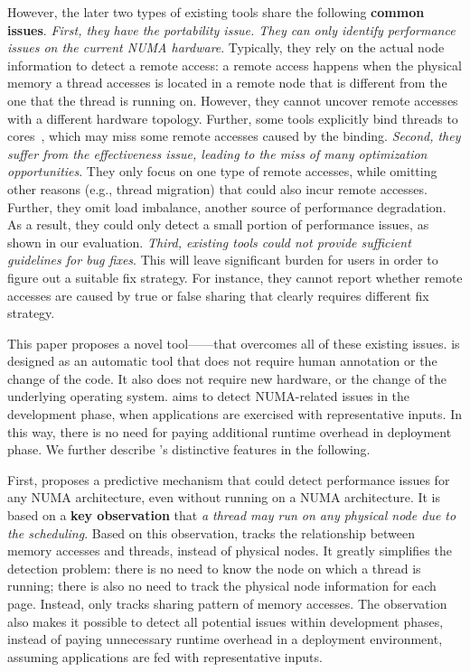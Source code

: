 However, the later two types of existing tools share the following \textbf{common issues}. \textit{First, they have the portability issue. They can only identify performance issues on the current NUMA hardware}. Typically, they rely on the actual node information to detect a remote access: a remote access happens when the physical memory a thread accesses is located in a remote node that is different from the one that the thread is running on. However, they cannot uncover remote accesses with a different hardware topology. Further, some  tools explicitly bind threads to cores~\cite{XuNuma}, which may miss some remote accesses caused by the binding. \textit{Second, they suffer from the effectiveness issue, leading to the miss of many optimization opportunities}. They only focus on one type of remote accesses, while omitting other reasons (e.g., thread migration) that could also incur remote accesses. Further, they omit load imbalance, another source of performance degradation. As a result, they could only detect a small portion of performance issues, as shown in our evaluation. \textit{Third, existing tools could not provide sufficient guidelines for bug fixes}. This will leave significant burden for users in order to figure out a suitable fix strategy. For instance, they cannot report whether remote accesses are caused by true or false sharing that clearly requires different fix strategy.   


This paper proposes a novel tool---\NP{}---that overcomes all of these existing issues. \NP{} is designed as an automatic tool that does not require human annotation or the change of the code. It also does not require new hardware, or the change of the underlying operating system. \NP{} aims to detect  NUMA-related issues in the development phase, when applications are exercised with representative inputs. In this way, there is no need for paying additional runtime overhead in deployment phase. We further describe \NP{}'s distinctive features in the following. 

First, \NP{} proposes a predictive mechanism that could detect performance issues for any NUMA architecture, even without running on a NUMA architecture. It is based on a \textbf{key observation} that \textit{a thread may run on any physical node due to the scheduling}. Based on this observation, \NP{} tracks the relationship between memory accesses and threads, instead of physical nodes. It greatly simplifies the detection problem: there is no need to know the node on which a thread is running; there is also no need to track the physical node information for each page. Instead, \NP{} only tracks sharing pattern of memory accesses. The observation also makes it possible to detect all potential issues within development phases, instead of paying unnecessary runtime overhead in a deployment environment, assuming applications are fed with representative inputs. 



